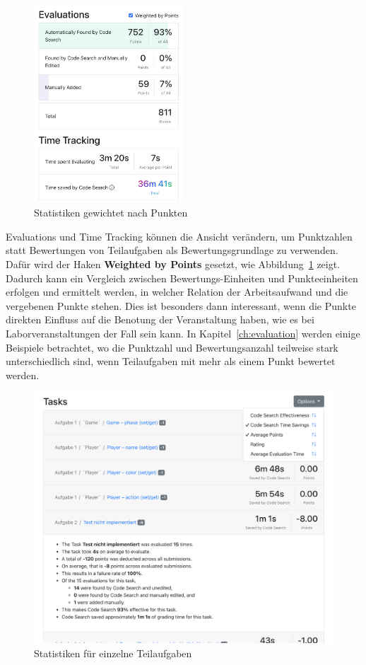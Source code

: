 \begin{figure}
    \centering
    \includegraphics[width=0.5\textwidth]{images/assignment-statistics-by-points}
    \caption{Statistiken gewichtet nach Punkten}
    \label{fig:assignment-statistics-by-points}
\end{figure}

Evaluations und Time Tracking können die Ansicht verändern, um Punktzahlen statt Bewertungen von Teilaufgaben als Bewertungsgrundlage zu verwenden.
Dafür wird der Haken \textbf{Weighted by Points} gesetzt, wie Abbildung~\ref{fig:assignment-statistics-by-points} zeigt.
Dadurch kann ein Vergleich zwischen Bewertungs-Einheiten und Punkteeinheiten erfolgen und ermittelt werden, in welcher Relation der Arbeitsaufwand und die vergebenen Punkte stehen.
Dies ist besonders dann interessant, wenn die Punkte direkten Einfluss auf die Benotung der Veranstaltung haben, wie es bei Laborveranstaltungen der Fall sein kann.
In Kapitel~\ref{ch:evaluation} werden einige Beispiele betrachtet, wo die Punktzahl und Bewertungsanzahl teilweise stark unterschiedlich sind, wenn Teilaufgaben mit mehr als einem Punkt bewertet werden.

\begin{figure}
    \centering
    \includegraphics[width=\textwidth]{images/assignment-statistics-tasks.png}
    \caption{Statistiken für einzelne Teilaufgaben}
    \label{fig:assignment-statistics-tasks}
\end{figure}

